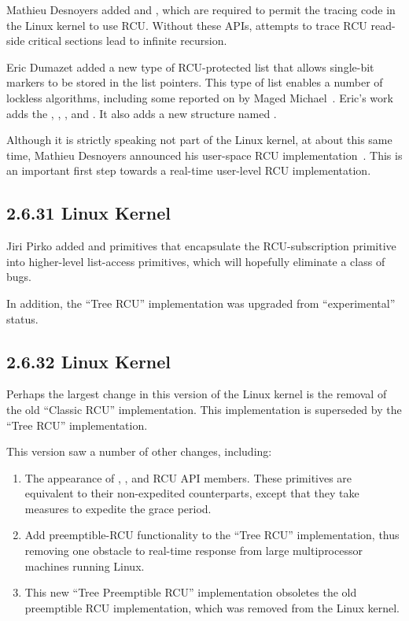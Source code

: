 Mathieu Desnoyers added
 and
,
which are required to permit the tracing code in the Linux kernel
to use RCU.
Without these APIs, attempts to trace RCU read-side critical sections
lead to infinite recursion.

Eric Dumazet added a new type of RCU-protected list that allows single-bit
markers to be stored in the list pointers.
This type of list enables a number of lockless algorithms, including
some reported on by Maged Michael~\cite{MagedMichael04a}.
Eric's work adds the ,
, , and
.
It also adds a new structure named .

Although it is strictly speaking not part of the Linux kernel, 
at about this same time, Mathieu Desnoyers announced his user-space
RCU implementation~\cite{MathieuDesnoyers2009URCU}.
This is an important first step towards a real-time user-level RCU
implementation.

\subsection{2.6.31 Linux Kernel}

Jiri Pirko added  and 
primitives that encapsulate the  RCU-subscription
primitive into higher-level list-access primitives, which will hopefully
eliminate a class of bugs.

In addition, the ``Tree RCU'' implementation was upgraded from
``experimental'' status.

\subsection{2.6.32 Linux Kernel}

Perhaps the largest change in this version of the Linux kernel
is the removal of the old ``Classic RCU'' implementation.
This implementation is superseded by the ``Tree RCU'' implementation.

This version saw a number of other changes, including:

\begin{enumerate}
\item	The appearance of ,
	, and
	 RCU API members.
	These primitives are equivalent to their non-expedited
	counterparts, except that they take measures to expedite the
	grace period.
\item	Add preemptible-RCU functionality to the ``Tree RCU''
	implementation, thus removing one obstacle to real-time
	response from large multiprocessor machines running Linux.
\item	This new ``Tree Preemptible RCU'' implementation obsoletes
	the old preemptible RCU implementation, which was removed
	from the Linux kernel.
\end{enumerate}

